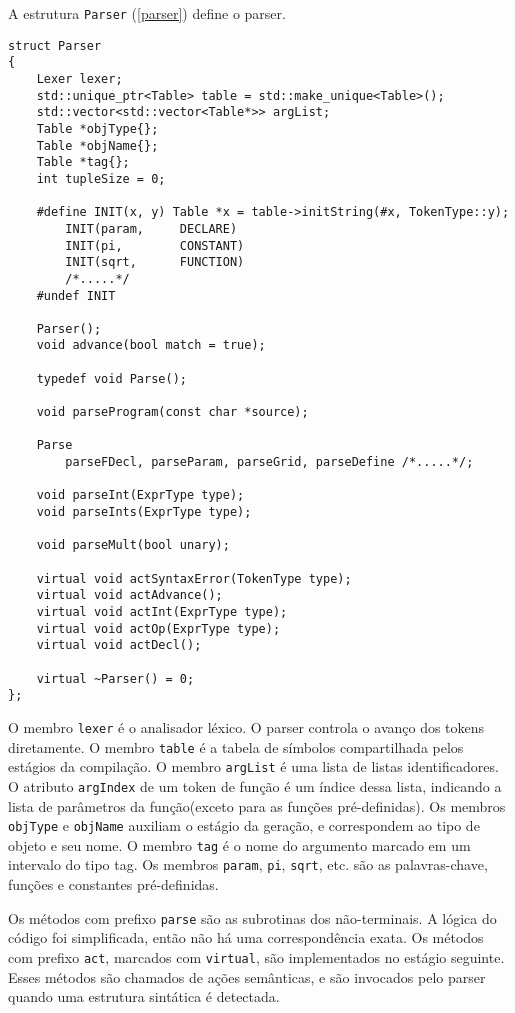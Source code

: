 \newpage
A estrutura \texttt{Parser} (\ref{parser}) define o parser.

\begin{lstlisting}[caption=Estrutura parcial do parser, label=parser]
struct Parser
{
    Lexer lexer;
    std::unique_ptr<Table> table = std::make_unique<Table>();
    std::vector<std::vector<Table*>> argList;
    Table *objType{};
    Table *objName{};
    Table *tag{};
    int tupleSize = 0;

    #define INIT(x, y) Table *x = table->initString(#x, TokenType::y);
        INIT(param,     DECLARE)
        INIT(pi,        CONSTANT)
        INIT(sqrt,      FUNCTION)
        /*.....*/
    #undef INIT

    Parser();
    void advance(bool match = true);

    typedef void Parse();

    void parseProgram(const char *source);

    Parse 
        parseFDecl, parseParam, parseGrid, parseDefine /*.....*/;

    void parseInt(ExprType type);
    void parseInts(ExprType type);

    void parseMult(bool unary);

    virtual void actSyntaxError(TokenType type);
    virtual void actAdvance();
    virtual void actInt(ExprType type);
    virtual void actOp(ExprType type);
    virtual void actDecl();

    virtual ~Parser() = 0;
};
\end{lstlisting}

O membro \texttt{lexer} é o analisador léxico.
O parser controla o avanço dos tokens diretamente.
O membro \texttt{table} é a tabela de símbolos compartilhada
pelos estágios da compilação.
O membro \texttt{argList} é uma lista de listas identificadores.
O atributo \texttt{argIndex} de um token de função é um índice dessa lista,
indicando a lista de parâmetros da função(exceto para as funções pré-definidas).
Os membros \texttt{objType} e \texttt{objName} auxiliam o estágio da geração,
e correspondem ao tipo de objeto e seu nome.
O membro \texttt{tag} é o nome do argumento marcado em um intervalo do tipo tag.
Os membros \texttt{param}, \texttt{pi}, \texttt{sqrt}, etc. são
as palavras-chave, funções e constantes pré-definidas.

Os métodos com prefixo \texttt{parse} são as subrotinas dos não-terminais.
A lógica do código foi simplificada, então não há uma correspondência exata.
Os métodos com prefixo \texttt{act}, marcados com \texttt{virtual},
são implementados no estágio seguinte.
Esses métodos são chamados de ações semânticas,
e são invocados pelo parser quando uma estrutura sintática é detectada.

